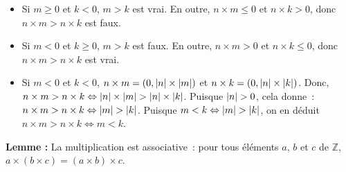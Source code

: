 \begin{itemize}[nosep]
\begin{itemize}[nosep]
                \item Si $m \geq 0$ et $k < 0$, $m > k$ est vrai.
                    En outre, $n \times m \leq 0$ et $n \times k > 0$, donc $n \times m > n \times k$ est faux.
                \item Si $m < 0$ et $k \geq 0$, $m > k$ est faux.
                    En outre, $n \times m > 0$ et $n \times k \leq 0$, donc $n \times m > n \times k$ est vrai.
                \item Si $m < 0$ et $k < 0$, $n \times m = (0, \left\lvert n \right\rvert \times \left\lvert m \right\rvert)$ et $n \times k = (0, \left\lvert n \right\rvert \times \left\lvert k \right\rvert)$.
                    Donc, $n \times m > n \times k \Leftrightarrow \left\lvert n \right\rvert \times \left\lvert m \right\rvert > \left\lvert n \right\rvert \times \left\lvert k \right\rvert$.
                    Puisque $\left\lvert n \right\rvert > 0$, cela donne : $n \times m > n \times k \Leftrightarrow \left\lvert m \right\rvert > \left\lvert k \right\rvert$. 
                    Puisque $m < k \Leftrightarrow \left\lvert m \right\rvert > \left\lvert k \right\rvert$, on en déduit $n \times m > n \times k \Leftrightarrow m < k$.
            \end{itemize}
    \end{itemize}

    \done

\medskip

\noindent\textbf{Lemme :} La multiplication est associative : pour tous éléments $a$, $b$ et $c$ de $\mathbb{Z}$, $a \times (b \times c) = (a \times b) \times c$.

\medskip

